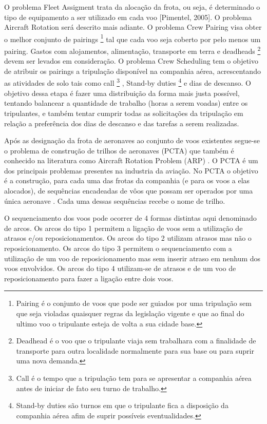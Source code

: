 	O problema Fleet Assigment trata da alocação da frota, ou seja, é determinado o tipo de equipamento a ser utilizado em cada voo [Pimentel, 2005]. O problema Aircraft Rotation será descrito mais adiante. O problema Crew Pairing visa obter o melhor conjunto de pairings \footnote{Pairing é o conjunto de voos que pode ser guiados por uma tripulação sem que seja violadas quaisquer regras da legislação vigente e que ao final do ultimo voo o tripulante esteja de volta a sua cidade base. }  tal que cada voo seja coberto por pelo menos um pairing. Gastos com alojamentos, alimentação, transporte em terra e deadheads \footnote{Deadhead é o voo que o tripulante viaja sem trabalhara com a finalidade de transporte para outra localidade normalmente para sua base ou para suprir uma nova demanda. } devem ser levados em consideração. O problema Crew Scheduling tem o objetivo de atribuir os pairings a tripulação disponível na companhia aérea, acrescentando as atividades de solo tais como call \footnote{Call é o tempo que a tripulação tem para se apresentar a companhia aérea antes de iniciar de fato seu turno de trabalho.} , Stand-by duties \footnote{Stand-by duties são turnos em que o tripulante fica a disposição da companhia aérea afim de suprir possíveis eventualidades.}  e dias de descanso. O objetivo dessa etapa é fazer uma distribuição da forma mais justa possível, tentando balancear a quantidade de trabalho (horas a serem voadas) entre os tripulantes, e também tentar cumprir todas as solicitações da tripulação em relação a preferência dos dias de descanso e das tarefas a serem realizadas.

	Após as designação da frota de aeronaves ao conjunto de voos existentes segue-se o problema de construção de trilhos de aeronaves (PCTA)  que também é conhecido na literatura como Aircraft Rotation Problem (ARP) . O PCTA é um dos principais problemas presentes na industria da aviação. No PCTA o objetivo é a construção, para cada uma das frotas da companhia (e para os voos a elas alocados), de sequências encadeadas de vôos que possam ser operados por uma única aeronave \citep{abiliolivro}. Cada uma dessas sequências recebe o nome de trilho.
 
	O sequenciamento dos voos pode ocorrer de 4 formas distintas aqui denominado de arcos. Os arcos do tipo 1 permitem a ligação de voos sem a utilização de atrasos e/ou reposicionamentos. Os arcos do tipo 2 utilizam atrasos mas não o reposicionamento. Os arcos do tipo 3 permitem o sequenciamento com a utilização de um voo de reposicionamento mas sem inserir atraso em nenhum dos voos envolvidos. Os arcos do tipo 4 utilizam-se de atrasos e de um voo de reposicionamento para fazer a ligação entre dois voos.
 
